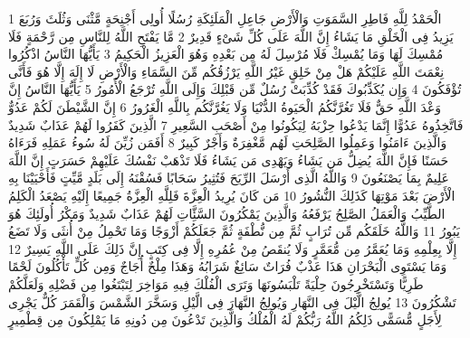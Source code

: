 \documentclass[20pt,a4paper]{article}
\title{}
\author{}
\date{}
\begin{document}
\pagecolor{cl_page}



{\tiny\colorbox{cl_aya}{1}} الْحَمْدُ لِلَّهِ فَاطِرِ السَّمَوَتِ وَالْأَرْضِ جَاعِلِ الْمَلَئِكَةِ رُسُلًا أُولِى أَجْنِحَةٍ مَّثْنَى وَثُلَثَ وَرُبَعَ يَزِيدُ فِى الْخَلْقِ مَا يَشَاءُ إِنَّ اللَّهَ عَلَى كُلِّ شَىْءٍ قَدِيرٌ
{\tiny\colorbox{cl_aya}{2}} مَّا يَفْتَحِ اللَّهُ لِلنَّاسِ مِن رَّحْمَةٍ فَلَا مُمْسِكَ لَهَا وَمَا يُمْسِكْ فَلَا مُرْسِلَ لَهُ مِن بَعْدِهِ وَهُوَ الْعَزِيزُ الْحَكِيمُ
{\tiny\colorbox{cl_aya}{3}} يَأَيُّهَا النَّاسُ اذْكُرُوا نِعْمَتَ اللَّهِ عَلَيْكُمْ هَلْ مِنْ خَلِقٍ غَيْرُ اللَّهِ يَرْزُقُكُم مِّنَ السَّمَاءِ وَالْأَرْضِ لَا إِلَهَ إِلَّا هُوَ فَأَنَّى تُؤْفَكُونَ
{\tiny\colorbox{cl_aya}{4}} وَإِن يُكَذِّبُوكَ فَقَدْ كُذِّبَتْ رُسُلٌ مِّن قَبْلِكَ وَإِلَى اللَّهِ تُرْجَعُ الْأُمُورُ
{\tiny\colorbox{cl_aya}{5}} يَأَيُّهَا النَّاسُ إِنَّ وَعْدَ اللَّهِ حَقٌّ فَلَا تَغُرَّنَّكُمُ الْحَيَوةُ الدُّنْيَا وَلَا يَغُرَّنَّكُم بِاللَّهِ الْغَرُورُ
{\tiny\colorbox{cl_aya}{6}} إِنَّ الشَّيْطَنَ لَكُمْ عَدُوٌّ فَاتَّخِذُوهُ عَدُوًّا إِنَّمَا يَدْعُوا حِزْبَهُ لِيَكُونُوا مِنْ أَصْحَبِ السَّعِيرِ
{\tiny\colorbox{cl_aya}{7}} الَّذِينَ كَفَرُوا لَهُمْ عَذَابٌ شَدِيدٌ وَالَّذِينَ ءَامَنُوا وَعَمِلُوا الصَّلِحَتِ لَهُم مَّغْفِرَةٌ وَأَجْرٌ كَبِيرٌ
{\tiny\colorbox{cl_aya}{8}} أَفَمَن زُيِّنَ لَهُ سُوءُ عَمَلِهِ فَرَءَاهُ حَسَنًا فَإِنَّ اللَّهَ يُضِلُّ مَن يَشَاءُ وَيَهْدِى مَن يَشَاءُ فَلَا تَذْهَبْ نَفْسُكَ عَلَيْهِمْ حَسَرَتٍ إِنَّ اللَّهَ عَلِيمٌ بِمَا يَصْنَعُونَ
{\tiny\colorbox{cl_aya}{9}} وَاللَّهُ الَّذِى أَرْسَلَ الرِّيَحَ فَتُثِيرُ سَحَابًا فَسُقْنَهُ إِلَى بَلَدٍ مَّيِّتٍ فَأَحْيَيْنَا بِهِ الْأَرْضَ بَعْدَ مَوْتِهَا كَذَلِكَ النُّشُورُ
{\tiny\colorbox{cl_aya}{10}} مَن كَانَ يُرِيدُ الْعِزَّةَ فَلِلَّهِ الْعِزَّةُ جَمِيعًا إِلَيْهِ يَصْعَدُ الْكَلِمُ الطَّيِّبُ وَالْعَمَلُ الصَّلِحُ يَرْفَعُهُ وَالَّذِينَ يَمْكُرُونَ السَّئَِّاتِ لَهُمْ عَذَابٌ شَدِيدٌ وَمَكْرُ أُولَئِكَ هُوَ يَبُورُ
{\tiny\colorbox{cl_aya}{11}} وَاللَّهُ خَلَقَكُم مِّن تُرَابٍ ثُمَّ مِن نُّطْفَةٍ ثُمَّ جَعَلَكُمْ أَزْوَجًا وَمَا تَحْمِلُ مِنْ أُنثَى وَلَا تَضَعُ إِلَّا بِعِلْمِهِ وَمَا يُعَمَّرُ مِن مُّعَمَّرٍ وَلَا يُنقَصُ مِنْ عُمُرِهِ إِلَّا فِى كِتَبٍ إِنَّ ذَلِكَ عَلَى اللَّهِ يَسِيرٌ
{\tiny\colorbox{cl_aya}{12}} وَمَا يَسْتَوِى الْبَحْرَانِ هَذَا عَذْبٌ فُرَاتٌ سَائِغٌ شَرَابُهُ وَهَذَا مِلْحٌ أُجَاجٌ وَمِن كُلٍّ تَأْكُلُونَ لَحْمًا طَرِيًّا وَتَسْتَخْرِجُونَ حِلْيَةً تَلْبَسُونَهَا وَتَرَى الْفُلْكَ فِيهِ مَوَاخِرَ لِتَبْتَغُوا مِن فَضْلِهِ وَلَعَلَّكُمْ تَشْكُرُونَ
{\tiny\colorbox{cl_aya}{13}} يُولِجُ الَّيْلَ فِى النَّهَارِ وَيُولِجُ النَّهَارَ فِى الَّيْلِ وَسَخَّرَ الشَّمْسَ وَالْقَمَرَ كُلٌّ يَجْرِى لِأَجَلٍ مُّسَمًّى ذَلِكُمُ اللَّهُ رَبُّكُمْ لَهُ الْمُلْكُ وَالَّذِينَ تَدْعُونَ مِن دُونِهِ مَا يَمْلِكُونَ مِن قِطْمِيرٍ
\end{document}
